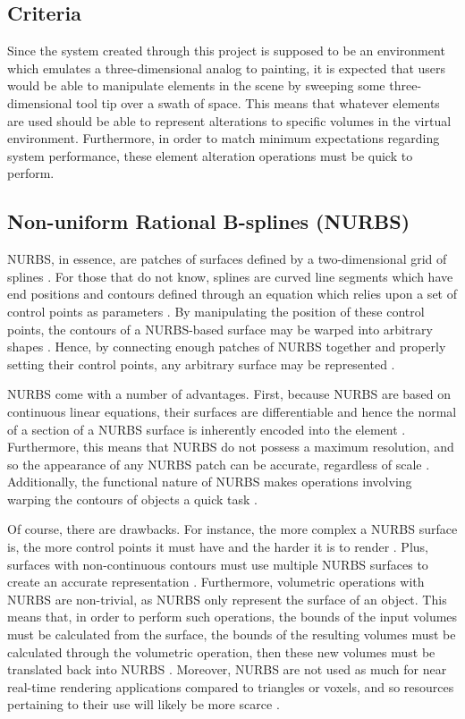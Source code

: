 \documentclass[onecolumn, draftclsnofoot,10pt, compsoc]{IEEEtran}
\begin{document}
\subsection{Criteria}

Since the system created through this project is supposed to be an environment which emulates a three-dimensional analog to painting, it is expected that users would be able to manipulate elements in the scene by sweeping some three-dimensional tool tip over a swath of space. This means that whatever elements are used should be able to represent alterations to specific volumes in the virtual environment. Furthermore, in order to match minimum expectations regarding system performance, these element alteration operations must be quick to perform.

\subsection{Non-uniform Rational B-splines (NURBS)}

NURBS, in essence, are patches of surfaces defined by a two-dimensional grid of splines \cite{1}\cite{2}.
For those that do not know, splines are curved line segments which have end positions and contours defined through an equation which relies upon a set of control points as parameters \cite{1}\cite{2}.
By manipulating the position of these control points, the contours of a NURBS-based surface may be warped into arbitrary shapes \cite{1}\cite{2}.
Hence, by connecting enough patches of NURBS together and properly setting their control points, any arbitrary surface may be represented \cite{1}\cite{2}.

NURBS come with a number of advantages.
First, because NURBS are based on continuous linear equations, their surfaces are differentiable and hence the normal of a section of a NURBS surface is inherently encoded into the element \cite{2}.
Furthermore, this means that NURBS do not possess a maximum resolution, and so the appearance of any NURBS patch can be accurate, regardless of scale \cite{2}.
Additionally, the functional nature of NURBS makes operations involving warping the contours of objects a quick task \cite{2}.

Of course, there are drawbacks.
For instance, the more complex a NURBS surface is, the more control points it must have and the harder it is to render \cite{2}.
Plus, surfaces with non-continuous contours must use multiple NURBS surfaces to create an accurate representation \cite{1}.
Furthermore, volumetric operations with NURBS are non-trivial, as NURBS only represent the surface of an object. 
This means that, in order to perform such operations, the bounds of the input volumes must be calculated from the surface, the bounds of the resulting volumes must be calculated through the volumetric operation, then these new volumes must be translated back into NURBS \cite{1}\cite{2}. 
Moreover, NURBS are not used as much for near real-time rendering applications compared to triangles or voxels, and so resources pertaining to their use will likely be more scarce \cite{1}.
\end{document}
